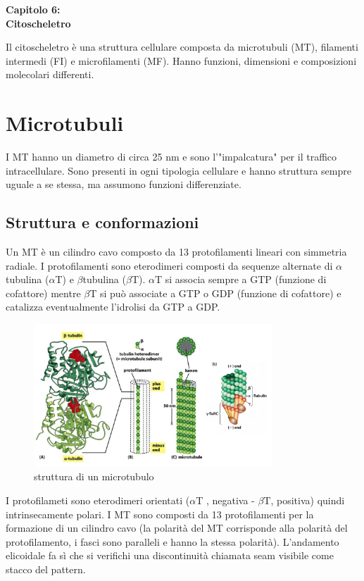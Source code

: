 \Huge\textbf{Capitolo 6: \\Citoscheletro}

\vspace{1cm}
\small
Il citoscheletro è una struttura cellulare composta da microtubuli (MT), filamenti intermedi (FI) e microfilamenti (MF). Hanno funzioni, dimensioni e composizioni molecolari differenti.

\section{Microtubuli}
    I MT hanno un diametro di circa 25 nm e sono l'"impalcatura" per il traffico intracellulare. Sono presenti in ogni tipologia cellulare e hanno struttura sempre uguale a se stessa, ma assumono funzioni differenziate.
    \subsection{Struttura e conformazioni}
        Un MT è un cilindro cavo composto da 13 protofilamenti lineari con simmetria radiale. I protofilamenti sono eterodimeri composti da sequenze alternate di $\alpha$tubulina ($\alpha$T) e $\beta$tubulina ($\beta$T). $\alpha$T si associa sempre a GTP (funzione di cofattore) mentre $\beta$T si può associate a GTP o GDP (funzione di cofattore) e catalizza eventualmente l'idrolisi da GTP a GDP.
        \begin{figure}[h]
            \centering
            \includegraphics[width=0.8\textwidth]{images/MT.JPG}
            \caption{\small struttura di un microtubulo}
            \label{fig:mesh1}
        \end{figure}
        I protofilameti sono eterodimeri orientati ($\alpha$T , negativa - $\beta$T, positiva) quindi intrinsecamente polari. I MT sono composti da 13 protofilamenti per la formazione di un cilindro cavo (la polarità del MT corrisponde alla polarità del protofilamento, i fasci sono paralleli e hanno la stessa polarità). L'andamento elicoidale fa sì che si verifichi una discontinuità chiamata seam visibile come stacco del pattern.    \\
